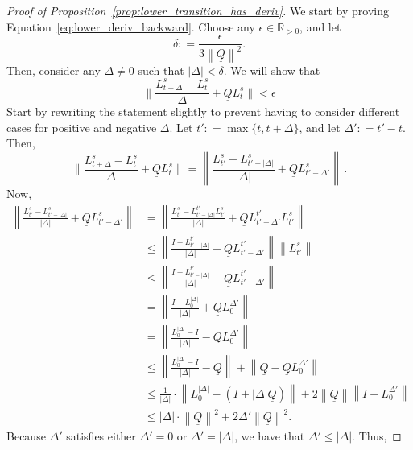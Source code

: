 \documentclass[10pt]{paper}
\theoremstyle{definition}
\newcommand{\reals}{\mathbb{R}}
\newcommand{\realspos}{\reals_{>0}}
\newcommand{\lrate}{\underline{Q}}
\newcommand{\norm}[1]{\left\lVert #1 \right\rVert}
\newcommand{\coloneqq}{:\!=}
\begin{document}
\begin{proof}[Proof of Proposition~\ref{prop:lower_transition_has_deriv}]
We start by proving Equation~\eqref{eq:lower_deriv_backward}. Choose any $\epsilon\in\realspos$, and let
\begin{equation}\label{eq:derivative_max_delta}
\delta \coloneqq \frac{\epsilon}{3\norm{\lrate}^2}.
\end{equation}
Then, consider any $\Delta\neq 0$ such that $\lvert\Delta\rvert<\delta$. We will show that
\begin{equation*}
\Big\lVert\frac{L_{t+\Delta}^s-L_t^s}{\Delta}+\lrate L_t^s\Big\rVert<\epsilon
\end{equation*}
Start by rewriting the statement slightly to prevent having to consider different cases for positive and negative $\Delta$. Let $t'\coloneqq\max\{t,t+\Delta\}$, and let $\Delta'\coloneqq t'-t$. Then,
\begin{equation*}
\Big\lVert\frac{L_{t+\Delta}^s-L_t^s}{\Delta}+\lrate L_t^s\Big\rVert = \norm{\frac{L_{t'}^s - L_{t'-\lvert\Delta\rvert}^s}{\lvert\Delta\rvert}+\lrate L_{t'-\Delta'}^s}\,.
\end{equation*}
Now,
\begin{align*}
\norm{\frac{L_{t'}^s - L_{t'-\lvert\Delta\rvert}^s}{\lvert\Delta\rvert}+\lrate L_{t'-\Delta'}^s} &= \norm{\frac{L_{t'}^s - L_{t'-\lvert\Delta\rvert}^{t'}L_{t'}^s}{\lvert\Delta\rvert}+\lrate L_{t'-\Delta'}^{t'}L_{t'}^s} \\
 &\leq \norm{\frac{I - L_{t'-\lvert\Delta\rvert}^{t'}}{\lvert\Delta\rvert}+\lrate L_{t'-\Delta'}^{t'}}\norm{L_{t'}^s} \\
 &\leq \norm{\frac{I - L_{t'-\lvert\Delta\rvert}^{t'}}{\lvert\Delta\rvert}+\lrate L_{t'-\Delta'}^{t'}} \\
 &= \norm{\frac{I - L_{0}^{\lvert\Delta\rvert}}{\lvert\Delta\rvert}+\lrate L_{0}^{\Delta'}} \\
 &= \norm{\frac{L_{0}^{\lvert\Delta\rvert} - I}{\lvert\Delta\rvert}-\lrate L_{0}^{\Delta'}} \\
 &\leq \norm{\frac{L_{0}^{\lvert\Delta\rvert} - I}{\lvert\Delta\rvert}-\lrate} + \norm{\lrate - \lrate L_{0}^{\Delta'}} \\
 &\leq \frac{1}{\lvert\Delta\rvert}\cdot\norm{L_{0}^{\lvert\Delta\rvert} - (I+\lvert\Delta\rvert\lrate)} + 2\norm{\lrate}\norm{I - L_{0}^{\Delta'}} \\
 &\leq \lvert\Delta\rvert\cdot\norm{\lrate}^2 + 2\Delta'\norm{\lrate}^2.
\end{align*}
Because $\Delta'$ satisfies either $\Delta'=0$ or $\Delta'=\lvert\Delta\rvert$, we have that $\Delta'\leq\lvert\Delta\rvert$. Thus,

\end{proof}
\end{document}
